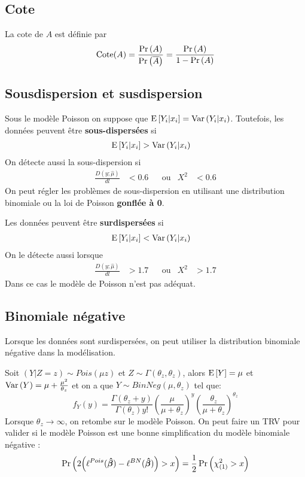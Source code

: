 \documentclass[10pt, french]{article}
\begin{document}
\begin{multicols*}{3}
\subsection*{Cote}
La cote de $A$ est définie par
\[\mathrm{Cote}(A) = \frac{\Pr \left( A \right)}{\Pr \left( \overline{A} \right)} = \frac{\Pr \left( A \right)}{1 - \Pr \left( A \right)} \]


\subsection*{Sousdispersion et susdispersion}
Sous le modèle Poisson on suppose que $\mathrm{E} \left[ Y_i |x_i \right] = \mathrm{Var} \left( Y_i | x_i \right)$. 
Toutefois, les données peuvent être \textbf{sous-dispersées} si
\begin{align*}
	\mathrm{E} \left[ Y_i |x_i \right] 
	&> 	\mathrm{Var} \left( Y_i | x_i \right) 
\end{align*}
On détecte aussi la sous-dispersion si 
\begin{align*}
	\frac{D(y ; \hat{\mu})}{dl} &< 0.6 	&
	&\text{ou} 	&
	X^2 &< 0.6	
\end{align*}
On peut régler les problèmes de sous-dispersion en utilisant une distribution binomiale ou la loi de Poisson \textbf{gonflée à 0}. 

Les données peuvent être \textbf{surdispersées} si
\begin{align*}
	\mathrm{E} \left[ Y_i |x_i \right] 
	&< 	\mathrm{Var} \left( Y_i | x_i \right)  
\end{align*}
On le détecte aussi lorsque
\begin{align*}
	\frac{D(y ; \hat{\mu})}{dl} &> 1.7 	&
	&\text{ou} 	&
	X^2 &> 1.7	
\end{align*}
Dans ce cas le modèle de Poisson n'est pas adéquat.
	
\subsection*{Binomiale négative}
Lorsque les données sont surdispersées, on peut utiliser la distribution binomiale négative dans la modélisation. 

Soit $(Y | Z = z) \sim Pois(\mu z)$ et $Z \sim \Gamma(\theta_z, \theta_z)$, alors $\mathrm{E} \left[ Y \right] = \mu$ et $\mathrm{Var} \left( Y \right) = \mu + \frac{\mu^2}{\theta_z}$ et on a que $Y \sim BinNeg(\mu, \theta_z)$ tel que:
\[
	f_Y(y) 
	= 	\frac{\Gamma(\theta_z + y)}{\Gamma(\theta_z) y!} 
			\left( \frac{\mu}{\mu + \theta_z} \right)^{y} 
			\left( \frac{\theta_z}{\mu + \theta_z} \right)^{\theta_z}  
\]
Lorsque $\theta_z \to \infty$, on retombe sur le modèle Poisson. 
On peut faire un TRV pour valider si le modèle Poisson est une bonne simplification du modèle binomiale négative : 
\[ 
	\Pr \left(  2\Big(\ell^{Pois}(\bm{\hat{\beta}}) - \ell^{BN}(\bm{\hat{\beta}}) \Big) > x \right) 
	= 	\frac{1}{2} \Pr \left( \chi_{(1)}^2 > x \right) 
\] 


\end{multicols*}
\end{document}
